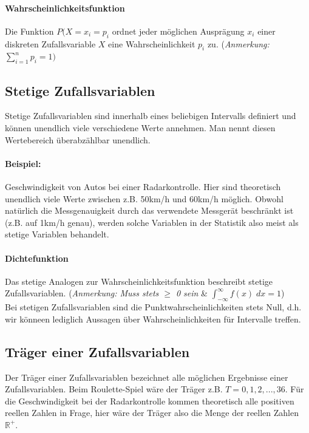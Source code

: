 \documentclass[a4paper]{article}
\newcommand{\R}{\mathbb{R}}
\newcommand\dangersign[1][2ex]{%
  \renewcommand\stacktype{L}%
  \scaleto{\stackon[1.3pt]{\color{red}$\triangle$}{\tiny !}}{#1}%
}
\begin{document}
\paragraph{Wahrscheinlichkeitsfunktion} Die Funktion $P(X = x_i= p_i$ ordnet jeder möglichen Ausprägung $x_i$ einer diskreten Zufallsvariable $X$ eine Wahrscheinlichkeit $p_i$ zu. (\textit{Anmerkung:} $\sum_{i=1}^n p_i = 1)$

\subsection{Stetige Zufallsvariablen} \label{sec:szv}
Stetige Zufallsvariablen sind innerhalb eines beliebigen Intervalls definiert und können unendlich viele verschiedene Werte annehmen. Man nennt diesen Wertebereich überabzählbar unendlich.

\paragraph{Beispiel:} Geschwindigkeit von Autos bei einer Radarkontrolle. Hier sind theoretisch unendlich viele Werte zwischen z.B. 50km/h und 60km/h möglich. Obwohl natürlich die Messgenauigkeit durch das verwendete Messgerät beschränkt ist (z.B. auf 1km/h genau), werden solche Variablen in der Statistik also meist als stetige Variablen behandelt.

\paragraph{Dichtefunktion} Das stetige Analogen zur Wahrscheinlichkeitsfunktion beschreibt stetige Zufallsvariablen. (\textit{Anmerkung: Muss stets $\geq$ 0 sein }\& $\int_{-\infty}^{\infty} f(x)\; dx = 1$)\\

\noindent \dangersign[3ex] Bei stetigen Zufallsvariablen sind die Punktwahrscheinlichkeiten stets Null, d.h. wir könneen lediglich Aussagen über Wahrscheinlichkeiten für Intervalle treffen.

\subsection{Träger einer Zufallsvariablen} \label{sec:traeger}

Der Träger einer Zufallsvariablen bezeichnet alle möglichen Ergebnisse einer Zufallsvariablen. Beim Roulette-Spiel wäre der Träger z.B. $ T = 0,1,2,...,36$. Für die Geschwindigkeit bei der Radarkontrolle kommen theoretisch alle positiven reellen Zahlen in Frage, hier wäre der Träger also die Menge der reellen Zahlen $\R^+$.
\end{document}
